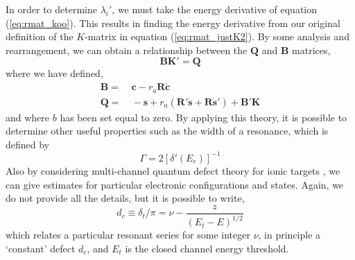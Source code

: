 In order to determine $\lambda_i'$, we must take the energy derivative of equation (\ref{eq:rmat_koo}). This results in finding the energy derivative from our original definition of the $K$-matrix in equation (\ref{eq:rmat_justK2}). By some analysis and rearrangement, we can obtain a relationship between the $\boldsymbol{Q}$ and $\boldsymbol{B}$ matrices,
\begin{equation}
\boldsymbol{BK}' = \boldsymbol{Q}
\end{equation}
where we have defined,
\[
\begin{split}
\boldsymbol{B} =&~ \boldsymbol{c}-r_a\boldsymbol{R}\dot{\boldsymbol{c}}\\
\boldsymbol{Q} =&~ -\boldsymbol{s}+r_a(\boldsymbol{R}'\dot{\boldsymbol{s}}+\boldsymbol{R}\boldsymbol{\dot{s}}') +\boldsymbol{B}'\boldsymbol{K}
\end{split} 
\]
and where $b$ has been set equal to zero. By applying this theory, it is possible to determine other useful properties such as the width of a resonance, which is defined by
\begin{equation}\label{eq:rmat_qbwidth}
\Gamma = 2[\delta'(E_r)]^{-1}
\end{equation}
Also by considering multi-channel quantum defect theory for ionic targets \citep{1983RPPh...46..167S}, we can give estimates for particular electronic configurations and states. Again, we do not provide all the details, but it is possible to write,
\begin{equation}\label{eq:rmat_qbdefect}
d_c\equiv\delta_t/\pi = \nu -\frac{z}{(E_t-E)^{1/2}}
\end{equation}
which relates a particular resonant series for some integer $\nu$, in principle a `constant' defect $d_c$, and $E_t$ is the closed channel energy threshold.





